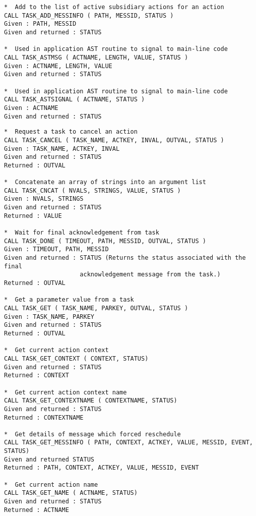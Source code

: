 \begin{verbatim}
*  Add to the list of active subsidiary actions for an action
CALL TASK_ADD_MESSINFO ( PATH, MESSID, STATUS )
Given : PATH, MESSID
Given and returned : STATUS

*  Used in application AST routine to signal to main-line code
CALL TASK_ASTMSG ( ACTNAME, LENGTH, VALUE, STATUS )
Given : ACTNAME, LENGTH, VALUE
Given and returned : STATUS

*  Used in application AST routine to signal to main-line code
CALL TASK_ASTSIGNAL ( ACTNAME, STATUS )
Given : ACTNAME
Given and returned : STATUS
\end{verbatim}
\newpage
\begin{verbatim}
*  Request a task to cancel an action
CALL TASK_CANCEL ( TASK_NAME, ACTKEY, INVAL, OUTVAL, STATUS )
Given : TASK_NAME, ACTKEY, INVAL
Given and returned : STATUS
Returned : OUTVAL

*  Concatenate an array of strings into an argument list
CALL TASK_CNCAT ( NVALS, STRINGS, VALUE, STATUS )
Given : NVALS, STRINGS
Given and returned : STATUS
Returned : VALUE

*  Wait for final acknowledgement from task
CALL TASK_DONE ( TIMEOUT, PATH, MESSID, OUTVAL, STATUS )
Given : TIMEOUT, PATH, MESSID
Given and returned : STATUS (Returns the status associated with the final
                     acknowledgement message from the task.)
Returned : OUTVAL

*  Get a parameter value from a task
CALL TASK_GET ( TASK_NAME, PARKEY, OUTVAL, STATUS )
Given : TASK_NAME, PARKEY
Given and returned : STATUS
Returned : OUTVAL

*  Get current action context
CALL TASK_GET_CONTEXT ( CONTEXT, STATUS)
Given and returned : STATUS
Returned : CONTEXT

*  Get current action context name
CALL TASK_GET_CONTEXTNAME ( CONTEXTNAME, STATUS)
Given and returned : STATUS
Returned : CONTEXTNAME

*  Get details of message which forced reschedule
CALL TASK_GET_MESSINFO ( PATH, CONTEXT, ACTKEY, VALUE, MESSID, EVENT, STATUS)
Given and returned STATUS
Returned : PATH, CONTEXT, ACTKEY, VALUE, MESSID, EVENT

*  Get current action name
CALL TASK_GET_NAME ( ACTNAME, STATUS)
Given and returned : STATUS
Returned : ACTNAME
\end{verbatim}
\newpage

